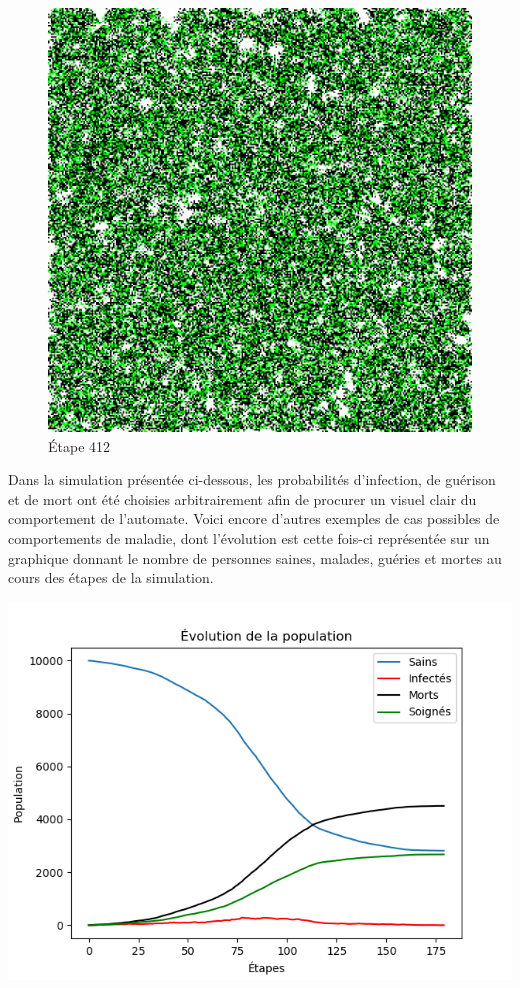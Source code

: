 \documentclass{article}
\begin{document}
\begin{figure}[hbtp]
\centering
\includegraphics[scale=0.22]{Frame-412.png}
\caption{Étape 412}
\end{figure}





Dans la simulation présentée ci-dessous, les probabilités d'infection, de guérison et de mort ont été choisies arbitrairement afin de procurer un visuel clair du comportement de l'automate. Voici encore d'autres exemples de cas possibles de comportements de maladie, dont l'évolution est cette fois-ci représentée sur un graphique donnant le nombre de personnes saines, malades, guéries et mortes au cours des étapes de la simulation.



\includegraphics[scale=1]{g.png} 
\end{document}

